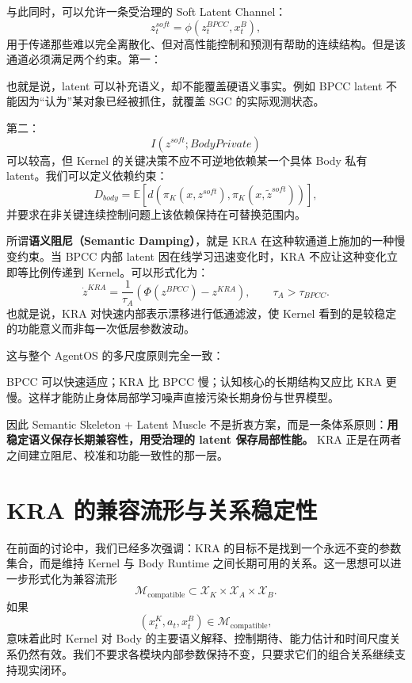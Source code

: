 与此同时，可以允许一条受治理的 Soft Latent Channel：
\[
z_t^{soft}
=
\phi
\left(
z_t^{BPCC},
x_t^B
\right),
\]
用于传递那些难以完全离散化、但对高性能控制和预测有帮助的连续结构。但是该通道必须满足两个约束。第一：
\begin{statementbox}
\centering
{}
\end{statementbox}
也就是说，latent 可以补充语义，却不能覆盖硬语义事实。例如 BPCC latent 不能因为``认为''某对象已经被抓住，就覆盖 SGC 的实际观测状态。

第二：
\[
I(z^{soft};BodyPrivate)
\]
可以较高，但 Kernel 的关键决策不应不可逆地依赖某一个具体 Body 私有 latent。我们可以定义依赖约束：
\[
D_{body}
=
\mathbb E
\left[
d
\left(
\pi_K(x,z^{soft}),
\pi_K(x,\tilde z^{soft})
\right)
\right],
\]
并要求在非关键连续控制问题上该依赖保持在可替换范围内。

所谓\textbf{语义阻尼（Semantic Damping）}，就是 KRA 在这种软通道上施加的一种慢变约束。当 BPCC 内部 latent 因在线学习迅速变化时，KRA 不应让这种变化立即等比例传递到 Kernel。可以形式化为：
\[
\dot z^{KRA}
=
\frac{1}{\tau_A}
\left(
\Phi(z^{BPCC})
-
z^{KRA}
\right),
\qquad
\tau_A>\tau_{BPCC}.
\]
也就是说，KRA 对快速内部表示漂移进行低通滤波，使 Kernel 看到的是较稳定的功能意义而非每一次低层参数波动。

这与整个 AgentOS 的多尺度原则完全一致：
\begin{statementbox}
\centering
{}
\end{statementbox}
BPCC 可以快速适应；KRA 比 BPCC 慢；认知核心的长期结构又应比 KRA 更慢。这样才能防止身体局部学习噪声直接污染长期身份与世界模型。

因此 Semantic Skeleton + Latent Muscle 不是折衷方案，而是一条体系原则：\textbf{用稳定语义保存长期兼容性，用受治理的 latent 保存局部性能。} KRA 正是在两者之间建立阻尼、校准和功能一致性的那一层。

\section{KRA 的兼容流形与关系稳定性}
\label{sec:kra-compatibility-manifold}

在前面的讨论中，我们已经多次强调：KRA 的目标不是找到一个永远不变的参数集合，而是维持 Kernel 与 Body Runtime 之间长期可用的关系。这一思想可以进一步形式化为兼容流形
\[
\boxed{
\mathcal M_{\mathrm{compatible}}
\subset
\mathcal X_K
\times
\mathcal X_A
\times
\mathcal X_B.
}
\]
如果
\[
(x^K_t,a_t,x^B_t)
\in
\mathcal M_{\mathrm{compatible}},
\]
意味着此时 Kernel 对 Body 的主要语义解释、控制期待、能力估计和时间尺度关系仍然有效。我们不要求各模块内部参数保持不变，只要求它们的组合关系继续支持现实闭环。

